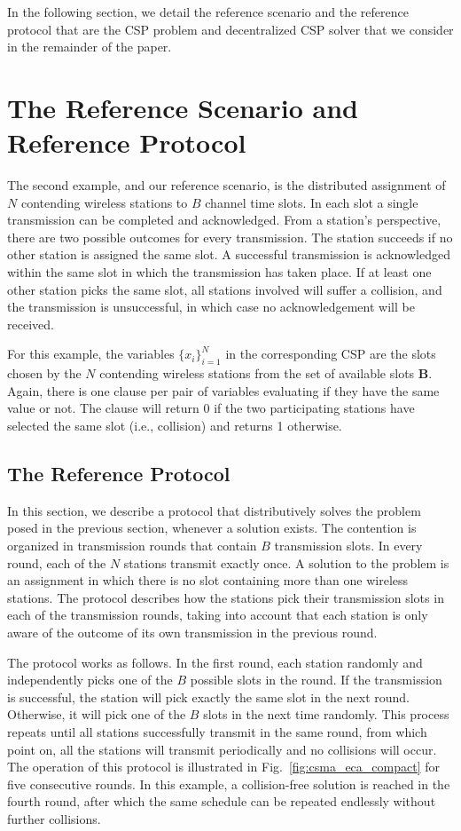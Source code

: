 \documentclass[journal]{IEEEtran}
\begin{document}
In the following section, we detail the reference scenario and the reference protocol that are the CSP problem and decentralized CSP solver that we consider in the remainder of the paper.

\section{The Reference Scenario and Reference Protocol}

The second example, and our reference scenario, is the distributed assignment of $N$ contending wireless stations to $B$ channel time slots. 
In each slot a single transmission can be completed and acknowledged. 
From a station's perspective, there are two possible outcomes for every transmission.
The station succeeds if no other station is assigned the same slot. 
A successful transmission is acknowledged within the same slot in which the transmission has taken place.
If at least one other station picks the same slot, all stations involved will suffer a collision, and the transmission is unsuccessful, in which case no acknowledgement will be received.


For this example, the variables $\{x_i\}_{i=1}^{N}$ in the corresponding CSP are the slots chosen by the $N$ contending wireless stations from the set of available slots $\mathbf{B}$. Again, there is one clause per pair of variables evaluating if they have the same value or not. The clause will return 0 if the two participating stations have selected the same slot (i.e., collision) and returns 1 otherwise.

\subsection{The Reference Protocol}

In this section, we describe a protocol that distributively solves the problem posed in the previous section, whenever a solution exists. The contention is organized in transmission rounds that contain $B$ transmission slots. In every round, each of the $N$ stations transmit exactly once. A solution to the problem is an assignment in which there is no slot containing more than one wireless stations. The protocol describes how the stations pick their transmission slots in each of the transmission rounds, taking into account that each station is only aware of the outcome of its own transmission in the previous round.

The protocol works as follows. In the first round, each station randomly and independently picks one of the $B$ possible slots in the round. If the transmission is successful, the station will pick exactly the same slot in the next round. Otherwise, it will pick one of the $B$ slots in the next time randomly. This process repeats until all stations successfully transmit in the same round, from which point on, all the stations will transmit periodically and no collisions will occur. The operation of this protocol is illustrated in Fig.~\ref{fig:csma_eca_compact} for five consecutive rounds. In this example, a collision-free solution is reached in the fourth round, after which the same schedule can be repeated endlessly without further collisions.
\end{document}
